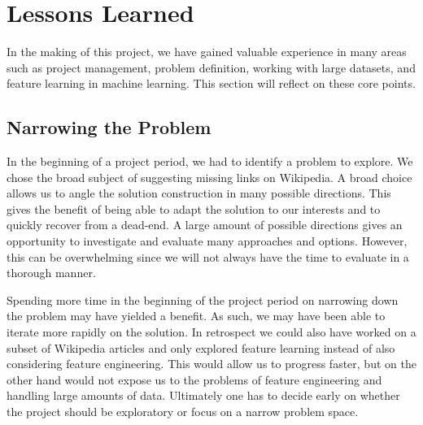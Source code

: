 \section{Lessons Learned}

In the making of this project, we have gained valuable experience in many areas such as project management, problem definition, working with large datasets, and feature learning in machine learning. This section will reflect on these core points.

\subsection{Narrowing the Problem}
In the beginning of a project period, we had to identify a problem to explore. We chose the broad subject of suggesting missing links on Wikipedia. A broad choice allows us to angle the solution construction in many possible directions. This gives the benefit of being able to adapt the solution to our interests and to quickly recover from a dead-end. A large amount of possible directions gives an opportunity to investigate and evaluate many approaches and options. However, this can be overwhelming since we will not always have the time to evaluate in a thorough manner.

Spending more time in the beginning of the project period on narrowing down the problem may have yielded a benefit. As such, we may have been able to iterate more rapidly on the solution. In retrospect we could also have worked on a subset of Wikipedia articles and only explored feature learning instead of also considering feature engineering. This would allow us to progress faster, but on the other hand would not expose us to the problems of feature engineering and handling large amounts of data. Ultimately one has to decide early on whether the project should be exploratory or focus on a narrow problem space.

